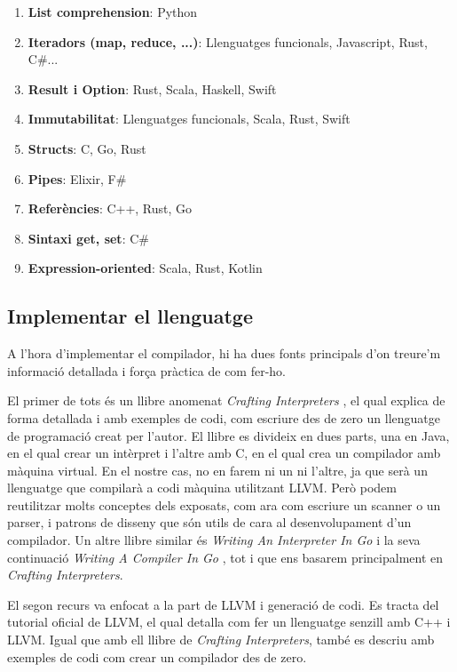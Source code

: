 ﻿\documentclass{article}
\begin{document}
\begin{enumerate}
\item \textbf{List comprehension}: Python
\item \textbf{Iteradors (map, reduce, ...)}: Llenguatges funcionals, Javascript, Rust, C\#...
\item \textbf{Result i Option}: Rust, Scala, Haskell, Swift
\item \textbf{Immutabilitat}: Llenguatges funcionals, Scala, Rust, Swift
\item \textbf{Structs}: C, Go, Rust
\item \textbf{Pipes}: Elixir, F\#
\item \textbf{Referències}: C++, Rust, Go
\item \textbf{Sintaxi get, set}: C\#
\item \textbf{Expression-oriented}: Scala, Rust, Kotlin
\end{enumerate}

\subsection{Implementar el llenguatge}
A l'hora d'implementar el compilador, hi ha dues fonts principals d'on treure'm
informació detallada i força pràctica de com fer-ho.

El primer de tots és un llibre anomenat \textit{Crafting Interpreters}
\cite{crafting-interpreters}, el qual explica de forma detallada i amb exemples
de codi, com escriure des de zero un llenguatge de programació creat per l'autor.
El llibre es divideix en dues parts, una en Java, en el qual crear un intèrpret
i l'altre amb C, en el qual crea un compilador amb màquina virtual. En el nostre cas,
no en farem ni un ni l'altre, ja que serà un llenguatge que compilarà a codi
màquina utilitzant LLVM. Però podem reutilitzar molts conceptes dels exposats,
com ara com escriure un scanner o un parser, i patrons de disseny que són
utils de cara al desenvolupament d'un compilador. Un altre llibre similar és
\textit{Writing An Interpreter In Go} \cite{interpreterbook} i la seva
continuació \textit{Writing A Compiler In Go} \cite{compilerbook}, tot i que
ens basarem principalment en \textit{Crafting Interpreters}.

El segon recurs va enfocat a la part de LLVM i generació de codi. Es tracta del
tutorial oficial de LLVM, el qual detalla com fer un llenguatge senzill amb C++
i LLVM. Igual que amb ell llibre de \textit{Crafting Interpreters}, també es
descriu amb exemples de codi com crear un compilador des de zero.
\end{document}

